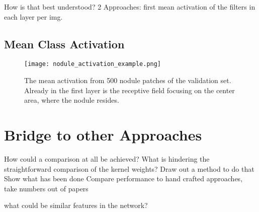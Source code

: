 \documentclass[main.tex]{subfiles}
\begin{document}
How is that best understood? 2 Approaches: first mean activation of the filters in each layer per img.

\subsection{Mean Class Activation}

\begin{figure}
\begin{center}
\texttt{[image: nodule\_activation\_example.png]}
\end{center}
\caption{The mean activation from 500 nodule patches of the validation set. Already in the first layer is the receptive field focusing on the center area, where the nodule resides.}
\label{fig:mean_activation}
\end{figure}


\section{Bridge to other Approaches}
How could a comparison at all be achieved? What is hindering the straightforward comparison of the kernel weights? Draw out a method to do that
Show what has been done
Compare performance to hand crafted approaches, 
take numbers out of papers

what could be similar features in the network?
\end{document}
